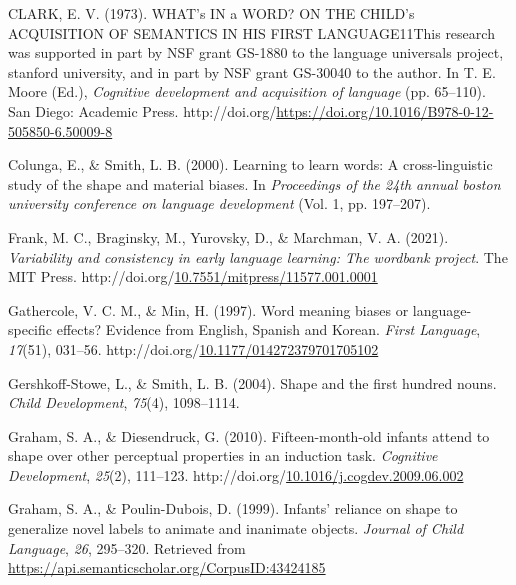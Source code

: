 \documentclass[10pt, letterpaper]{article}
\newenvironment{CSLReferences}%
  {}%
  {\par}
\begin{document}
\begin{CSLReferences}{1}{0}
\leavevmode{}%
CLARK, E. V. (1973). WHAT's IN a WORD? ON THE CHILD's ACQUISITION OF
SEMANTICS IN HIS FIRST LANGUAGE11This research was supported in part by
NSF grant GS-1880 to the language universals project, stanford
university, and in part by NSF grant GS-30040 to the author. In T. E.
Moore (Ed.), \emph{Cognitive development and acquisition of language}
(pp. 65--110). San Diego: Academic Press.
http://doi.org/\url{https://doi.org/10.1016/B978-0-12-505850-6.50009-8}

\leavevmode{}%
Colunga, E., \& Smith, L. B. (2000). Learning to learn words: A
cross-linguistic study of the shape and material biases. In
\emph{Proceedings of the 24th annual boston university conference on
language development} (Vol. 1, pp. 197--207).

\leavevmode{}%
Frank, M. C., Braginsky, M., Yurovsky, D., \& Marchman, V. A. (2021).
\emph{Variability and consistency in early language learning: The
wordbank project}. The MIT Press.
http://doi.org/\href{https://doi.org/10.7551/mitpress/11577.001.0001}{10.7551/mitpress/11577.001.0001}

\leavevmode{}%
Gathercole, V. C. M., \& Min, H. (1997). Word meaning biases or
language-specific effects? {Evidence} from {English}, {Spanish} and
{Korean}. \emph{First Language}, \emph{17}(51), 031--56.
http://doi.org/\href{https://doi.org/10.1177/014272379701705102}{10.1177/014272379701705102}

\leavevmode{}%
Gershkoff-Stowe, L., \& Smith, L. B. (2004). Shape and the first hundred
nouns. \emph{Child Development}, \emph{75}(4), 1098--1114.

\leavevmode{}%
Graham, S. A., \& Diesendruck, G. (2010). Fifteen-month-old infants
attend to shape over other perceptual properties in an induction task.
\emph{Cognitive Development}, \emph{25}(2), 111--123.
http://doi.org/\href{https://doi.org/10.1016/j.cogdev.2009.06.002}{10.1016/j.cogdev.2009.06.002}

\leavevmode{}%
Graham, S. A., \& Poulin-Dubois, D. (1999). Infants' reliance on shape
to generalize novel labels to animate and inanimate objects.
\emph{Journal of Child Language}, \emph{26}, 295--320. Retrieved from
\url{https://api.semanticscholar.org/CorpusID:43424185}


\end{CSLReferences}
\end{document}
